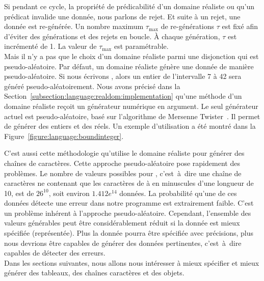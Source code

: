 Si pendant ce cycle, la propriété de prédicabilité d'un domaine réaliste ou
qu'un prédicat invalide une donnée, nous parlons de {\strong rejet}. Et suite à
un rejet, une donnée est re-générée. Un nombre maximum $\tau_\mathrm{max}$ de
re-générations $\tau$ est fixé afin d'éviter des générations et des rejets en
boucle. À chaque génération, $\tau$ est incrémenté de 1. La valeur de
$\tau_\mathrm{max}$ est paramétrable. \\

Mais il n'y a pas que le choix d'un domaine réaliste parmi une disjonction qui
est pseudo-aléatoire. Par défaut, un domaine réaliste génère une donnée de
manière pseudo-aléatoire.  Si nous écrivons , alors un
entier de l'intervalle 7 à 42 sera généré pseudo-aléatoirement. Nous avons
précisé dans la Section~\ref{subsection:language:realdom:implementation} qu'une
méthode  d'un domaine réaliste reçoit un générateur numérique en
argument. Le seul générateur actuel est pseudo-aléatoire, basé sur l'algorithme
de Mersenne Twister~. Il permet de générer des entiers et
des réels. Un exemple d'utilisation a été montré dans la
Figure~\ref{figure:language:boundinteger}.

C'est aussi cette méthodologie qu'utilise le domaine réaliste  pour
générer des chaînes de caractères. Cette approche pseudo-aléatoire pose
rapidement des problèmes. Le nombre de valeurs possibles pour , c'est~à~dire une chaîne de caractères ne contenant que les caractères
de  à  en minuscules d'une longueur de 10, est de $26^{10}$,
soit environ $1.412e^{14}$ données. La probabilité qu'une de ces données détecte
une erreur dans notre programme est extrairement faible. C'est un problème
inhérent à l'approche pseudo-aléatoire. Cependant, l'ensemble des valeurs
générables peut être considérablement réduit si la donnée est mieux spécifiée
(représentée). Plus la donnée pourra être spécifiée avec précisions, plus nous
devrions être capables de générer des données pertinentes, c'est~à~dire capables
de détecter des erreurs. \\

Dans les sections suivantes, nous allons nous intéresser à mieux spécifier et
mieux générer des tableaux, des chaînes caractères et des objets.
